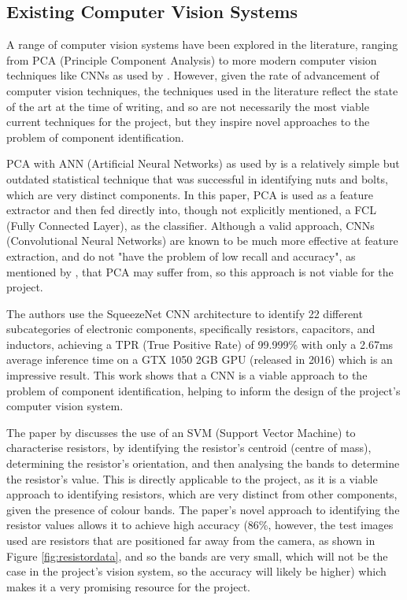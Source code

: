 \subsection{Existing Computer Vision Systems}
A range of computer vision systems have been explored in the literature, ranging from PCA (Principle Component Analysis) \citet{Dhenge2013MechanicalNS} to more modern computer vision techniques like CNNs as used by \citet{Xu2020,s22239079}. However, given the rate of advancement of computer vision
techniques, the techniques used in the literature reflect the state of the art at the time of writing, and so are not necessarily the most viable current techniques for the project, but they inspire novel approaches to the problem of component identification.

PCA with ANN (Artificial Neural Networks) as used by \citet{Dhenge2013MechanicalNS} is a relatively simple but outdated statistical technique that was successful in identifying nuts and bolts, which are very distinct components. 
In this paper, PCA is used as a feature extractor and then fed directly into, though not explicitly mentioned, a FCL (Fully Connected Layer), as the classifier. Although a valid approach, CNNs (Convolutional Neural Networks) are known to be much more
effective at feature extraction, and do not "have the problem of low recall and accuracy", as mentioned by \citet{Xu2020}, that PCA may suffer from, so this approach is not viable for the project. 

The authors \citet{Xu2020} use the SqueezeNet CNN architecture to identify 22 different subcategories of electronic components, specifically resistors, capacitors, and inductors, achieving a TPR (True Positive Rate) of 99.999\% with only a 2.67ms average inference time on a 
GTX 1050 2GB GPU (released in 2016) which is an impressive result. This work shows that a CNN is a viable approach to the problem of component identification, helping to inform the design of the project's computer vision system.

The paper by \citet{8939034} discusses the use of an SVM (Support Vector Machine) to characterise resistors, by identifying the resistor's centroid (centre of mass), determining the resistor's orientation, and then analysing the bands to determine the resistor's value.
This is directly applicable to the project, as it is a viable approach to identifying resistors, which are very distinct from other components, given the presence of colour bands. The paper's novel approach to identifying the resistor values allows it to achieve high accuracy (86\%, however,
the test images used are resistors that are positioned far away from the camera, as shown in Figure \ref{fig:resistordata}, and so the bands are very small, which will not be the case in the project's vision system, so the accuracy will likely be higher) which makes it a very promising resource for the project.


